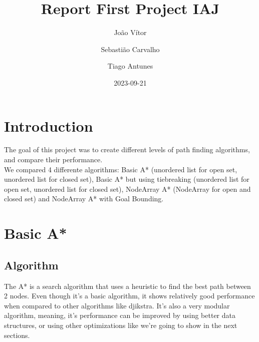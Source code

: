 \documentclass{article}
\title{Report First Project IAJ}
\author{João Vítor
  \and Sebastião Carvalho
  \and Tiago Antunes}
\date{2023-09-21}
\begin{document}
  \maketitle
  \section{Introduction}
  The goal of this project was to create different levels of path finding algorithms, and compare their performance.\\
  We compared 4 differente algorithms: Basic A* (unordered list for open set, unordered list for closed set), Basic A* but using tiebreaking 
  (unordered list for open set, unordered list for closed set), NodeArray A* (NodeArray for open and closed set) 
  and NodeArray A* with Goal Bounding.\\
  \section{Basic A*}
  \subsection{Algorithm}
  The A* is a search algorithm that uses a heuristic to find the best path between 2 nodes. Even though it's a basic algorithm, it shows relatively good 
  performance when compared to other algorithms like djikstra. It's also a very modular algorithm, meaning, it's performance can be improved by using better data structures,
  or using other optimizations like we're going to show in the next sections.\\
\end{document}
